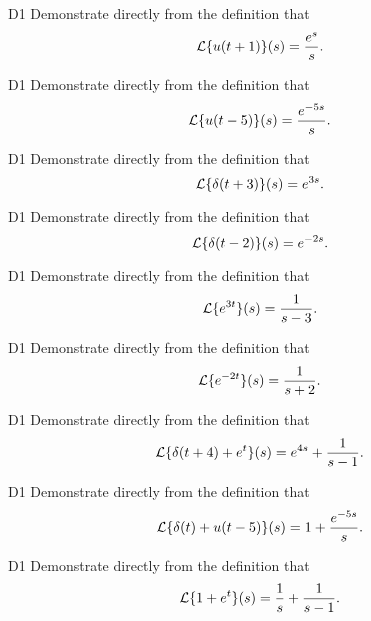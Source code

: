 \begin{problem}{D1}
Demonstrate directly from the definition that \[\mathcal{L}\{u(t+1)\}(s)=\frac{e^{s}}{s}.\]
\end{problem}

\begin{problem}{D1}
Demonstrate directly from the definition that \[\mathcal{L}\{u(t-5)\}(s)=\frac{e^{-5s}}{s}.\]
\end{problem}

\begin{problem}{D1}
Demonstrate directly from the definition that \[\mathcal{L}\{\delta(t+3)\}(s)=e^{3s}.\]
\end{problem}

\begin{problem}{D1}
Demonstrate directly from the definition that \[\mathcal{L}\{\delta(t-2)\}(s)=e^{-2s}.\]
\end{problem}

\begin{problem}{D1}
Demonstrate directly from the definition that \[\mathcal{L}\{e^{3t}\}(s)=\frac{1}{s-3}.\]
\end{problem}

\begin{problem}{D1}
Demonstrate directly from the definition that \[\mathcal{L}\{e^{-2t}\}(s)=\frac{1}{s+2}.\]
\end{problem}

\begin{problem}{D1}
Demonstrate directly from the definition that \[\mathcal{L}\{\delta(t+4)+e^t\}(s)=e^{4s}+\frac{1}{s-1}.\]
\end{problem}

\begin{problem}{D1}
Demonstrate directly from the definition that \[\mathcal{L}\{\delta(t)+u(t-5)\}(s)=1+\frac{e^{-5s}}{s}.\]
\end{problem}

\begin{problem}{D1}
Demonstrate directly from the definition that \[\mathcal{L}\{1+e^{t}\}(s)=\frac{1}{s}+\frac{1}{s-1}.\]
\end{problem}
